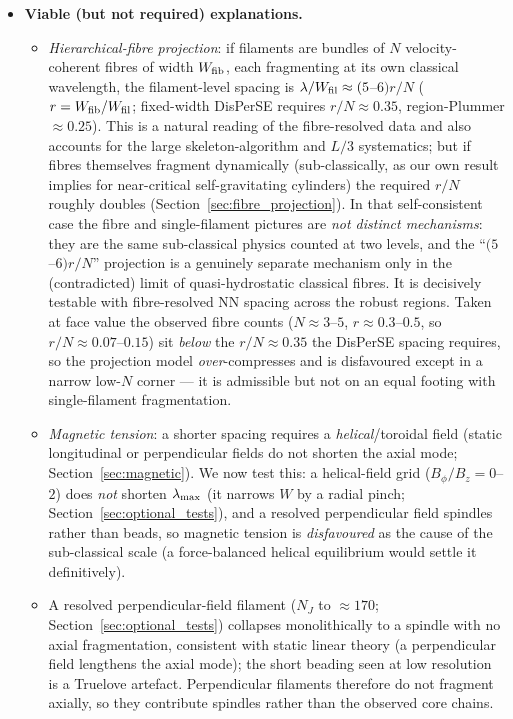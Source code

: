 \documentclass[usenatbib,twoside,twocolumn]{mnras}
\begin{document}
\begin{itemize}
    \item \textbf{Viable (but not required) explanations.}
    \begin{itemize}
        \item \emph{Hierarchical-fibre projection}: if filaments are bundles of $N$ velocity-coherent fibres of width $W_{\rm fib}$, each fragmenting at its own classical wavelength, the filament-level spacing is $\lambda/W_{\rm fil}\approx(5$--$6)r/N$ ($r=W_{\rm fib}/W_{\rm fil}$; fixed-width DisPerSE requires $r/N\approx0.35$, region-Plummer $\approx0.25$). This is a natural reading of the fibre-resolved data \citep{Yang2024,Hacar2013} and also accounts for the large skeleton-algorithm and $L/3$ systematics; but if fibres themselves fragment dynamically (sub-classically, as our own result implies for near-critical self-gravitating cylinders) the required $r/N$ roughly doubles (Section~\ref{sec:fibre_projection}). In that self-consistent case the fibre and single-filament pictures are \emph{not distinct mechanisms}: they are the same sub-classical physics counted at two levels, and the ``$(5$--$6)r/N$'' projection is a genuinely separate mechanism only in the (contradicted) limit of quasi-hydrostatic classical fibres. It is decisively testable with fibre-resolved NN spacing across the robust regions. Taken at face value the observed fibre counts ($N\approx3$--$5$, $r\approx0.3$--$0.5$, so $r/N\approx0.07$--$0.15$) sit \emph{below} the $r/N\approx0.35$ the DisPerSE spacing requires, so the projection model \emph{over}-compresses and is disfavoured except in a narrow low-$N$ corner --- it is admissible but not on an equal footing with single-filament fragmentation.
        \item \emph{Magnetic tension}: a shorter spacing requires a \emph{helical}/toroidal field \citep{Fiege2000} (static longitudinal or perpendicular fields do not shorten the axial mode; Section~\ref{sec:magnetic}). We now test this: a helical-field grid ($B_\phi/B_z=0$--$2$) does \emph{not} shorten $\lambda_{\rm max}$ (it narrows $W$ by a radial pinch; Section~\ref{sec:optional_tests}), and a resolved perpendicular field spindles rather than beads, so magnetic tension is \emph{disfavoured} as the cause of the sub-classical scale (a force-balanced helical equilibrium would settle it definitively).
        \item A resolved perpendicular-field filament ($N_J$ to $\approx170$; Section~\ref{sec:optional_tests}) collapses monolithically to a spindle with no axial fragmentation, consistent with static linear theory (a perpendicular field lengthens the axial mode); the short beading seen at low resolution is a Truelove artefact. Perpendicular filaments therefore do not fragment axially, so they contribute spindles rather than the observed core chains.
    \end{itemize}


\end{itemize}
\end{document}
